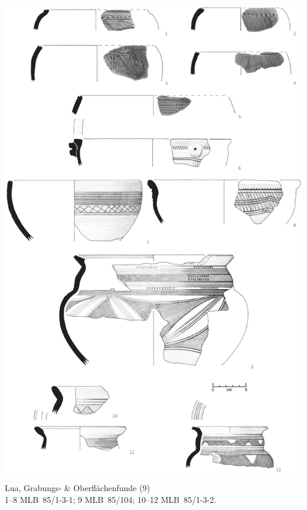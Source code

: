 \begin{pl}[H]
	\includegraphics{plt/Taf26.pdf}
	\vspace{.75em}\caption{Lua, Grabungs- \& Oberflächenfunde (9) \\ 1--8 MLB~85/1-3-1; 9 MLB~85/104; 10--12 MLB~85/1-3-2.}
	\label{pl:26}
\end{pl}

